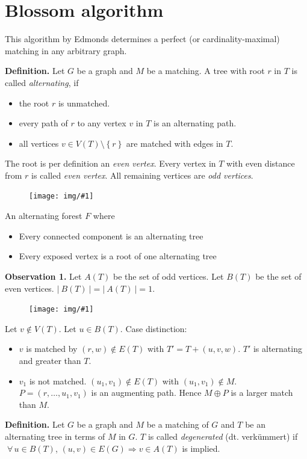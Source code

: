 \documentclass[a4paper]{article}
\theoremstyle{definition}
\newcommand{\drawing}[1]{%
 \begin{figure}[t]
  \begin{center}
   \texttt{[image: img/\#1]}
  \end{center}
 \end{figure}
}
\newcommand{\card}[1]{\left|\:\!#1\:\!\right|}
\newcommand{\set}[1]{\left\{#1\right\}}
\newcommand{\fall}{\;\forall\,}
\begin{document}
\section{Blossom algorithm}
%
This algorithm by Edmonds determines a perfect (or cardinality-maximal) matching in any arbitrary graph.

\textbf{Definition.}
  Let $G$ be a graph and $M$ be a matching.
  A tree with root $r$ in $T$ is called \emph{alternating}, if
  \begin{itemize}
    \item the root $r$ is unmatched.
    \item every path of $r$ to any vertex $v$ in $T$ is an alternating path.
    \item all vertices $v \in V(T) \setminus \set{r}$ are matched with edges in $T$.
  \end{itemize}
  The root is per definition an \emph{even vertex}.
  Every vertex in $T$ with even distance from $r$ is called \emph{even vertex}.
  All remaining vertices are \emph{odd vertices}.

  \drawing{alternating_tree.pdf}

  An alternating forest $F$ where
  \begin{itemize}
    \item Every connected component is an alternating tree
    \item Every exposed vertex is a root of one alternating tree
  \end{itemize}

\textbf{Observation 1.}
  Let $A(T)$ be the set of odd vertices.
  Let $B(T)$ be the set of even vertices.
  $\card{B(T)} = \card{A(T)} = 1$.

  \drawing{alernating_paths_observation_1.pdf}

  Let $v \notin V(T)$. Let $u \in B(T)$. Case distinction:
  \begin{itemize}
    \item $v$ is matched by $(r,w) \notin E(T)$ with $T' = T + (u, v, w)$.
      $T'$ is alternating and greater than $T$.
    \item $v_1$ is not matched. $(u_1, v_1) \notin E(T)$ with $(u_1, v_1) \notin M$.
      $P = (r, \ldots, u_1, v_1)$ is an augmenting path. Hence $M \oplus P$ is a larger match than $M$.
  \end{itemize}

\textbf{Definition.}
  Let $G$ be a graph and $M$ be a matching of $G$ and $T$ be an alternating tree in terms of $M$ in $G$.
  $T$ is called \emph{degenerated} (dt. verkümmert) if $\fall u \in B(T)$, $(u, v) \in E(G) \Rightarrow v \in A(T)$ is implied.
\end{document}
